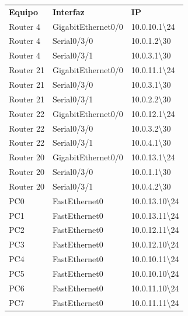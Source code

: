 \documentclass[spanish]{udpreport}
\begin{document}
\begin{table}[H]
\centering
\begin{tabular}{p{3cm}|p{4cm}|p{4cm}}
\textbf{Equipo} & \textbf{Interfaz} & \textbf{IP} \\
       Router 4 & GigabitEthernet0/0 & 10.0.10.1\textbackslash 24 \\
       Router 4 & Serial0/3/0 & 10.0.1.2\textbackslash 30 \\
       Router 4 & Serial0/3/1 & 10.0.3.1\textbackslash 30 \\
       Router 21 & GigabitEthernet0/0 & 10.0.11.1\textbackslash 24 \\
       Router 21 & Serial0/3/0 & 10.0.3.1\textbackslash 30 \\
       Router 21 & Serial0/3/1 & 10.0.2.2\textbackslash 30 \\
       Router 22 & GigabitEthernet0/0 & 10.0.12.1\textbackslash 24 \\
       Router 22 & Serial0/3/0 & 10.0.3.2\textbackslash 30 \\
       Router 22 & Serial0/3/1 & 10.0.4.1\textbackslash 30 \\
       Router 20 & GigabitEthernet0/0 & 10.0.13.1\textbackslash 24 \\
       Router 20 & Serial0/3/0 & 10.0.1.1\textbackslash 30 \\
       Router 20 & Serial0/3/1 & 10.0.4.2\textbackslash 30 \\
       PC0 & FastEthernet0 & 10.0.13.10\textbackslash 24 \\
       PC1 & FastEthernet0 & 10.0.13.11\textbackslash 24 \\
       PC2 & FastEthernet0 & 10.0.12.11\textbackslash 24 \\
       PC3 & FastEthernet0 & 10.0.12.10\textbackslash 24 \\
       PC4 & FastEthernet0 & 10.0.10.11\textbackslash 24 \\
       PC5 & FastEthernet0 & 10.0.10.10\textbackslash 24 \\
       PC6 & FastEthernet0 & 10.0.11.10\textbackslash 24 \\
       PC7 & FastEthernet0 & 10.0.11.11\textbackslash 24 \\
\end{tabular}
\end{table}
\end{document}

